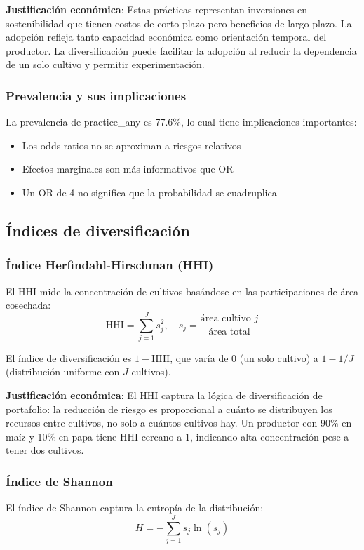 \documentclass[11pt,a4paper]{article}
\newcommand{\HHI}{\text{HHI}}
\begin{document}
\textbf{Justificación económica}: Estas prácticas representan inversiones en sostenibilidad que tienen costos de corto plazo pero beneficios de largo plazo. La adopción refleja tanto capacidad económica como orientación temporal del productor. La diversificación puede facilitar la adopción al reducir la dependencia de un solo cultivo y permitir experimentación.

\subsubsection{Prevalencia y sus implicaciones}
La prevalencia de practice\_any es 77.6\%, lo cual tiene implicaciones importantes:
\begin{itemize}
    \item Los odds ratios no se aproximan a riesgos relativos
    \item Efectos marginales son más informativos que OR
    \item Un OR de 4 no significa que la probabilidad se cuadruplica
\end{itemize}

\subsection{Índices de diversificación}

\subsubsection{Índice Herfindahl-Hirschman (HHI)}
El HHI mide la concentración de cultivos basándose en las participaciones de área cosechada:
\[
\HHI = \sum_{j=1}^{J} s_j^2, \quad s_j = \frac{\text{área cultivo } j}{\text{área total}}
\]

El índice de diversificación es $1 - \HHI$, que varía de 0 (un solo cultivo) a $1 - 1/J$ (distribución uniforme con $J$ cultivos).

\textbf{Justificación económica}: El HHI captura la lógica de diversificación de portafolio: la reducción de riesgo es proporcional a cuánto se distribuyen los recursos entre cultivos, no solo a cuántos cultivos hay. Un productor con 90\% en maíz y 10\% en papa tiene HHI cercano a 1, indicando alta concentración pese a tener dos cultivos.

\subsubsection{Índice de Shannon}
El índice de Shannon captura la entropía de la distribución:
\[
H = -\sum_{j=1}^{J} s_j \ln(s_j)
\]
\end{document}
